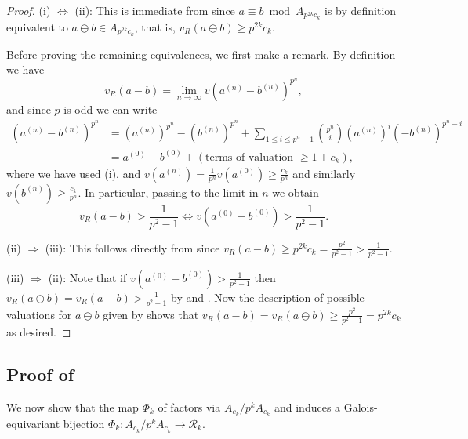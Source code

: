 \documentclass{amsart}
\theoremstyle{definition}
\numberwithin{theorem}{section}
\numberwithin{equation}{section}
\begin{document}
\begin{proof}
(i) $\Leftrightarrow$ (ii): This is immediate from  since $a \equiv b \bmod{A_{p^{2k}c_k}}$ is by definition equivalent to $a \ominus b \in A_{ p^{2k}c_k}$, that is, $v_R(a \ominus b) \geq p^{2k}c_k$.

Before proving the remaining equivalences, we first make a remark. By definition we have
\[
v_R(a - b) = \lim_{n \to \infty} v\left( a^{(n)} - b^{(n)} \right)^{p^n},
\]
and since $p$ is odd we can write
\begin{equation*}
\begin{aligned}
\left( a^{(n)} - b^{(n)} \right)^{p^n} & = \left( a^{(n)} \right)^{p^n} - \left( b^{(n)} \right)^{p^n} + \sum_{1 \leq i \leq p^n-1} \binom{p^n}{i}  \left( a^{(n)} \right)^i \left( -b^{(n)} \right)^{p^n-i} \\
& = a^{(0)}-b^{(0)} + \left(\text{terms of valuation }\geq 1+c_k\right),
\end{aligned}
\end{equation*}
where we have used (i), and $v(a^{(n)}) = \frac{1}{p^n}v(a^{(0)}) \geq \frac{c_k}{p^n}$ and similarly $v(b^{(n)}) \geq \frac{c_k}{p^n}$.
In particular, passing to the limit in $n$ we obtain 
\begin{equation}\label{eq: equivalence pos valuation}
    v_R(a-b) > \frac{1}{p^2-1} \Longleftrightarrow v(a^{(0)}-b^{(0)}) > \frac{1}{p^2-1}.
\end{equation}

(ii) $\Rightarrow$ (iii): This follows directly from  since $v_R(a-b) \geq p^{2k}c_k = \frac{p^2}{p^2-1} > \frac{1}{p^2-1}$.  

(iii) $\Rightarrow$ (ii): Note that if $v(a^{(0)}-b^{(0)}) > \frac{1}{p^2-1}$ then $v_R(a \ominus b) =v_R(a-b) > \frac{1}{p^2-1}$ by  and . Now the description of possible valuations for $a \ominus b$ given by  shows that $v_R(a-b)=v_R(a \ominus b) \geq \frac{p^2}{p^2-1}=p^{2k}c_k$ as desired.
\end{proof}


\subsection{Proof of }\label{subsect: proof of iso}
We now show that the map $\Phi_k$ of  factors via $A_{c_k}/p^kA_{c_k}$ and induces a Galois-equivariant bijection $\Phi_k : A_{c_k}/ p^kA_{c_k} \to \mathcal{R}_k$.
\end{document}
